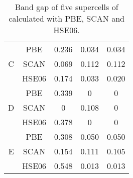 \begin{table}[H]
\begin{tabular}{@{}ccccc@{}}
\multicolumn{1}{c|}{\multirow{3}{*}{C}} & PBE           & 0.236                                                           & 0.034                                                           & 0.034                                                            \\
\multicolumn{1}{c|}{}                   & SCAN          & 0.069                                                           & 0.112                                                           & 0.112                                                            \\
\multicolumn{1}{c|}{}                   & HSE06         & 0.174                                                           & 0.033                                                           & 0.020                                                            \\ \midrule
\multicolumn{1}{c|}{\multirow{3}{*}{D}} & PBE           & 0.339                                                           & 0                                                           & 0                                                                 \\
\multicolumn{1}{c|}{}                   & SCAN          & 0                                                                & 0.108                                                           & 0                                                                 \\
\multicolumn{1}{c|}{}                   & HSE06         & 0.378                                                           & 0                                                                & 0                                                                 \\ \midrule
\multicolumn{1}{c|}{\multirow{3}{*}{E}} & PBE           & 0.308                                                           & 0.050                                                           & 0.050                                                            \\
\multicolumn{1}{c|}{}                   & SCAN          & 0.154                                                           & 0.111                                                           & 0.105                                                            \\
\multicolumn{1}{c|}{}                   & HSE06         & 0.548                                                           & 0.013                                                           & 0.013                                                            \\ \bottomrule
\end{tabular}
\caption{Band gap of five supercells of  calculated with PBE, SCAN and HSE06.}
\end{table}

